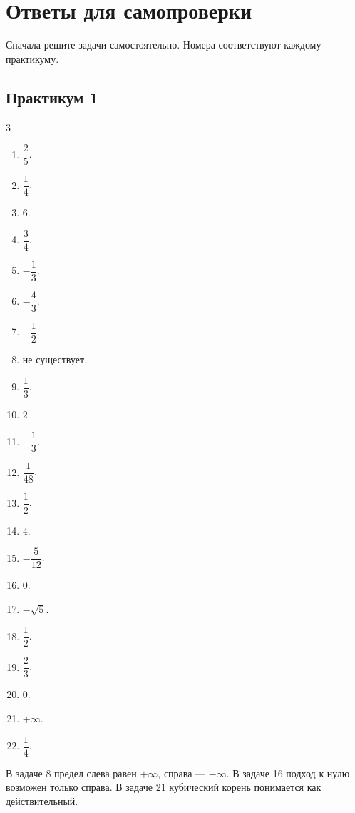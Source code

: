 \clearpage
\section*{Ответы для самопроверки}
Сначала решите задачи самостоятельно. Номера соответствуют каждому практикуму.
\subsection*{Практикум 1}
\begin{multicols}{3}
\begin{enumerate}
\item $\dfrac25$.
\item $\dfrac14$.
\item $6$.
\item $\dfrac34$.
\item $-\dfrac13$.
\item $-\dfrac43$.
\item $-\dfrac12$.
\item $\text{не существует}$.
\item $\dfrac13$.
\item $2$.
\item $-\dfrac13$.
\item $\dfrac1{48}$.
\item $\dfrac12$.
\item $4$.
\item $-\dfrac5{12}$.
\item $0$.
\item $-\sqrt5$.
\item $\dfrac12$.
\item $\dfrac23$.
\item $0$.
\item $+\infty$.
\item $\dfrac14$.
\end{enumerate}
\end{multicols}
В задаче 8 предел слева равен $+\infty$, справа --- $-\infty$. В задаче 16 подход к нулю возможен только справа. В задаче 21 кубический корень понимается как действительный.
